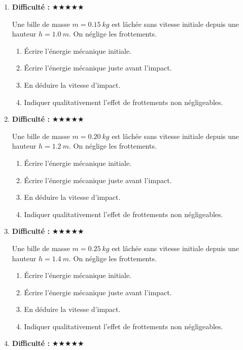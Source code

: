 \documentclass[11pt,a4paper]{article}
\newcommand{\etoiles}[1]{\textbf{Difficulté : }#1}
\begin{document}
\begin{enumerate}[label=\textbf{Exercice \arabic*.},leftmargin=*]
Un système de masse $m=0.6\ \si{kg}$ est modélisé par un point matériel.
Entre deux instants séparés de $\Delta t=0.10\ \si{s}$, la somme des forces a pour norme $F=23\ \si{N}$.
\begin{enumerate}[label=\alph*)]
\item Évaluer la norme de $\Delta \vec v$.
\item Comment évolue cette valeur si la masse est doublée ?
\item Comment évolue cette valeur si l'intervalle de temps est doublé ?
\item Expliquer le lien géométrique entre $\Delta\vec v$ et $\sum \vec F$.
\end{enumerate}
\item \etoiles{★★★★★}

Une bille de masse $m=0.15\ \si{kg}$ est lâchée sans vitesse initiale depuis une hauteur $h=1.0\ \si{m}$.
On néglige les frottements.
\begin{enumerate}[label=\alph*)]
\item Écrire l'énergie mécanique initiale.
\item Écrire l'énergie mécanique juste avant l'impact.
\item En déduire la vitesse d'impact.
\item Indiquer qualitativement l'effet de frottements non négligeables.
\end{enumerate}
\item \etoiles{★★★★★}

Une bille de masse $m=0.20\ \si{kg}$ est lâchée sans vitesse initiale depuis une hauteur $h=1.2\ \si{m}$.
On néglige les frottements.
\begin{enumerate}[label=\alph*)]
\item Écrire l'énergie mécanique initiale.
\item Écrire l'énergie mécanique juste avant l'impact.
\item En déduire la vitesse d'impact.
\item Indiquer qualitativement l'effet de frottements non négligeables.
\end{enumerate}
\item \etoiles{★★★★★}

Une bille de masse $m=0.25\ \si{kg}$ est lâchée sans vitesse initiale depuis une hauteur $h=1.4\ \si{m}$.
On néglige les frottements.
\begin{enumerate}[label=\alph*)]
\item Écrire l'énergie mécanique initiale.
\item Écrire l'énergie mécanique juste avant l'impact.
\item En déduire la vitesse d'impact.
\item Indiquer qualitativement l'effet de frottements non négligeables.
\end{enumerate}
\item \etoiles{★★★★★}


\end{enumerate}
\end{document}
